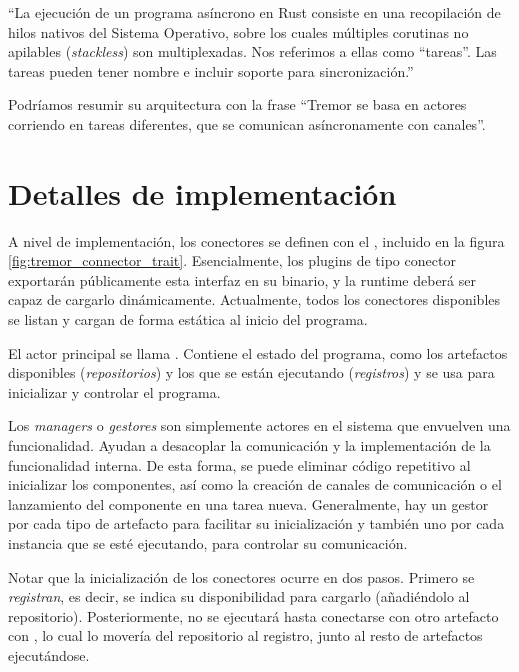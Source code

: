``La ejecución de un programa asíncrono en Rust consiste en una recopilación de
hilos nativos del Sistema Operativo, sobre los cuales múltiples corutinas no
apilables (\emph{stackless}) son multiplexadas. Nos referimos a ellas como
``tareas''. Las tareas pueden tener nombre e incluir soporte para
sincronización.''~\cite{asyncstd_task}

Podríamos resumir su arquitectura con la frase ``Tremor se basa en actores
corriendo en tareas diferentes, que se comunican asíncronamente con canales''.

\section{Detalles de implementación}

A nivel de implementación, los conectores se definen con el \trait
{}, incluido en la figura \ref{fig:tremor_connector_trait}.
Esencialmente, los plugins de tipo conector exportarán públicamente esta
interfaz en su binario, y la runtime deberá ser capaz de cargarlo dinámicamente.
Actualmente, todos los conectores disponibles se listan y cargan de forma
estática al inicio del programa.

El actor principal se llama . Contiene el estado del programa, como
los artefactos disponibles (\emph{repositorios}) y los que se están ejecutando
(\emph{registros}) y se usa para inicializar y controlar el programa.

Los \emph{managers} o \emph{gestores} son simplemente actores en el sistema que
envuelven una funcionalidad. Ayudan a desacoplar la comunicación y la
implementación de la funcionalidad interna. De esta forma, se puede eliminar
código repetitivo al inicializar los componentes, así como la creación de
canales de comunicación o el lanzamiento del componente en una tarea nueva.
Generalmente, hay un gestor por cada tipo de artefacto para facilitar su
inicialización y también uno por cada instancia que se esté ejecutando, para
controlar su comunicación.

Notar que la inicialización de los conectores ocurre en dos pasos. Primero se
\emph{registran}, es decir, se indica su disponibilidad para cargarlo
(añadiéndolo al repositorio). Posteriormente, no se ejecutará hasta conectarse
con otro artefacto con , lo cual lo movería del repositorio
al registro, junto al resto de artefactos ejecutándose.

